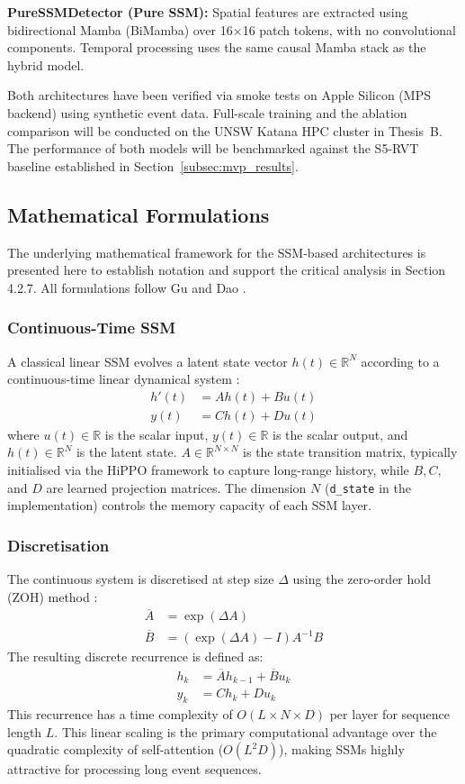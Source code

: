 \documentclass[11pt, a4paper]{report}
\begin{document}
\textbf{PureSSMDetector (Pure SSM):} Spatial features are extracted using bidirectional Mamba (BiMamba) over 16$\times$16 patch tokens, with no convolutional components. Temporal processing uses the same causal Mamba stack as the hybrid model.

Both architectures have been verified via smoke tests on Apple Silicon (MPS backend) using synthetic event data. Full-scale training and the ablation comparison will be conducted on the UNSW Katana HPC cluster in Thesis~B. The performance of both models will be benchmarked against the S5-RVT baseline established in Section~\ref{subsec:mvp_results}.
\subsection{Mathematical Formulations}
The underlying mathematical framework for the SSM-based architectures is presented here to establish notation and support the critical analysis in Section 4.2.7. All formulations follow Gu and Dao \cite{gu2023mamba}.

\subsubsection{Continuous-Time SSM}
A classical linear SSM evolves a latent state vector $h(t) \in \mathbb{R}^N$ according to a continuous-time linear dynamical system \cite{gu2022efficiently, gu2023mamba}:
\begin{align}
    h'(t) &= A h(t) + B u(t) \\
    y(t) &= C h(t) + D u(t)
\end{align}
where $u(t) \in \mathbb{R}$ is the scalar input, $y(t) \in \mathbb{R}$ is the scalar output, and $h(t) \in \mathbb{R}^N$ is the latent state. $A \in \mathbb{R}^{N \times N}$ is the state transition matrix, typically initialised via the HiPPO framework \cite{gu2022efficiently} to capture long-range history, while $B, C,$ and $D$ are learned projection matrices. The dimension $N$ (\texttt{d\_state} in the implementation) controls the memory capacity of each SSM layer.

\subsubsection{Discretisation}
The continuous system is discretised at step size $\Delta$ using the zero-order hold (ZOH) method \cite{gu2023mamba}:
\begin{align}
    \overline{A} &= \exp(\Delta A) \\
    \overline{B} &= (\exp(\Delta A) - I) A^{-1} B
\end{align}
The resulting discrete recurrence is defined as:
\begin{align}
    h_k &= \overline{A} h_{k-1} + \overline{B} u_k \\
    y_k &= C h_k + D u_k
\end{align}
This recurrence has a time complexity of $O(L \times N \times D)$ per layer for sequence length $L$. This linear scaling is the primary computational advantage over the quadratic complexity of self-attention ($O(L^2 D)$), making SSMs highly attractive for processing long event sequences.
\end{document}
